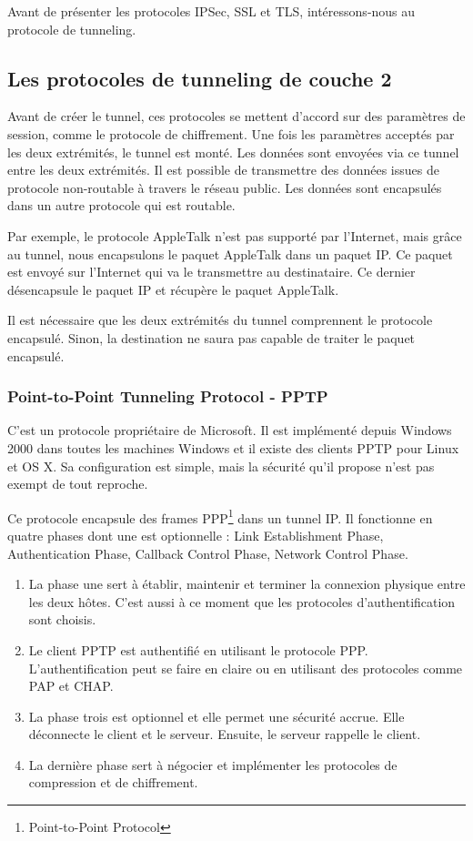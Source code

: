 Avant de présenter les protocoles IPSec, SSL et TLS, intéressons-nous au protocole de tunneling.
\subsection{Les protocoles de tunneling de couche 2}
Avant de créer le tunnel, ces protocoles se mettent d'accord sur des paramètres de session, comme le protocole de chiffrement.
Une fois les paramètres acceptés par les deux extrémités, le tunnel est monté.
Les données sont envoyées via ce tunnel entre les deux extrémités.
Il est possible de transmettre des données issues de protocole non-routable à travers le réseau public. 
Les données sont encapsulés dans un autre protocole qui est routable.

Par exemple, le protocole AppleTalk n'est pas supporté par l'Internet, mais grâce au tunnel, nous encapsulons le paquet AppleTalk dans un paquet IP. 
Ce paquet est envoyé sur l'Internet qui va le transmettre au destinataire.
Ce dernier désencapsule le paquet IP et récupère le paquet AppleTalk. 

Il est nécessaire que les deux extrémités du tunnel comprennent le protocole encapsulé.
Sinon, la destination ne saura pas capable de traiter le paquet encapsulé. 

\subsubsection{Point-to-Point Tunneling Protocol - PPTP}
C'est un protocole propriétaire de Microsoft.
Il est implémenté depuis Windows 2000 dans toutes les machines Windows et il existe des clients PPTP pour Linux et OS X.
Sa configuration est simple, mais la sécurité qu'il propose n'est pas exempt de tout reproche.

Ce protocole encapsule des frames PPP\footnote{Point-to-Point Protocol} dans un tunnel IP.
Il fonctionne en quatre phases dont une est optionnelle : Link Establishment Phase, Authentication Phase, Callback Control Phase, Network Control Phase.
\begin{enumerate}
	\item La phase une sert à établir, maintenir et terminer la connexion physique entre les deux hôtes. C'est aussi à ce moment que les protocoles d'authentification sont choisis.
	\item Le client PPTP est authentifié en utilisant le protocole PPP. L'authentification peut se faire en claire ou en utilisant des protocoles comme PAP et CHAP. 
	\item La phase trois est optionnel et elle permet une sécurité accrue. Elle déconnecte le client et le serveur. Ensuite, le serveur rappelle le client. 
	\item La dernière phase sert à négocier et implémenter les protocoles de compression et de chiffrement.
\end{enumerate}
